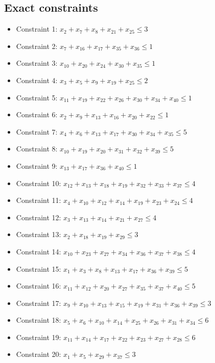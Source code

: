 \documentclass[11pt]{article}
\begin{document}
\subsection*{Exact constraints}
\begin{itemize}
\item Constraint 1: $x_{2} + x_{7} + x_{8} + x_{21} + x_{25} \le 3$
\item Constraint 2: $x_{7} + x_{16} + x_{17} + x_{35} + x_{36} \le 1$
\item Constraint 3: $x_{10} + x_{20} + x_{24} + x_{30} + x_{35} \le 1$
\item Constraint 4: $x_{3} + x_{5} + x_{9} + x_{19} + x_{25} \le 2$
\item Constraint 5: $x_{11} + x_{19} + x_{22} + x_{26} + x_{30} + x_{34} + x_{40} \le 1$
\item Constraint 6: $x_{2} + x_{9} + x_{13} + x_{16} + x_{20} + x_{22} \le 1$
\item Constraint 7: $x_{4} + x_{6} + x_{13} + x_{17} + x_{30} + x_{34} + x_{35} \le 5$
\item Constraint 8: $x_{10} + x_{19} + x_{20} + x_{31} + x_{32} + x_{39} \le 5$
\item Constraint 9: $x_{13} + x_{17} + x_{36} + x_{40} \le 1$
\item Constraint 10: $x_{12} + x_{13} + x_{18} + x_{19} + x_{32} + x_{33} + x_{37} \le 4$
\item Constraint 11: $x_{4} + x_{10} + x_{12} + x_{14} + x_{19} + x_{23} + x_{24} \le 4$
\item Constraint 12: $x_{3} + x_{13} + x_{14} + x_{21} + x_{27} \le 4$
\item Constraint 13: $x_{2} + x_{18} + x_{19} + x_{29} \le 3$
\item Constraint 14: $x_{10} + x_{23} + x_{27} + x_{34} + x_{36} + x_{37} + x_{38} \le 4$
\item Constraint 15: $x_{1} + x_{3} + x_{8} + x_{13} + x_{17} + x_{36} + x_{39} \le 5$
\item Constraint 16: $x_{11} + x_{12} + x_{20} + x_{27} + x_{35} + x_{37} + x_{40} \le 5$
\item Constraint 17: $x_{9} + x_{10} + x_{13} + x_{15} + x_{19} + x_{31} + x_{36} + x_{39} \le 3$
\item Constraint 18: $x_{5} + x_{6} + x_{10} + x_{14} + x_{25} + x_{26} + x_{31} + x_{34} \le 6$
\item Constraint 19: $x_{11} + x_{14} + x_{17} + x_{22} + x_{23} + x_{27} + x_{28} \le 6$
\item Constraint 20: $x_{1} + x_{5} + x_{29} + x_{37} \le 3$

\end{itemize}
\end{document}
